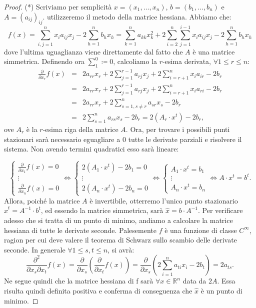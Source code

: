 \begin{proof}(*)
Scriviamo per semplicità $x=(x_1,\ldots,x_n)$, $b=(b_1,\ldots,b_n)$ e $A=(a_{ij})_{ij}$. utilizzeremo il metodo della matrice hessiana. Abbiamo che:
$$f(x)=\sum_{i,j=1}^n x_i a_{ij}x_j  -   2\sum_{h=1}^n b_h x_h= \sum_{k=1}^n a_{kk}x_k^2  +  2\sum_{i=2}^n\sum_{j=1}^{i-1} x_i a_{ij} x_j   -2\sum_{h=1}^n b_h x_h $$ dove l'ultima uguaglianza viene direttamente dal fatto che $A$ è una matrice simmetrica. Definendo ora $\sum_{1}^0 \coloneqq 0$,  calcoliamo la $r$-esima derivata, $\forall 1\leq r\leq n$:
\begin{eqnarray*}
\frac{\partial}{\partial x_r}f(x) &=& 2a_{rr}x_r +2\sum_{j=1}^{r-1}  a_{rj}x_j +2\sum_{i=r+1}^n x_i a_{ir}  -2b_r  \\
&=& 2a_{rr}x_r +2\sum_{j=1}^{r-1}  a_{rj}x_j +2\sum_{i=r+1}^n x_i a_{ri}   -2b_r \\
&=& 2a_{rr}x_r +2\sum_{s=1, s\neq r}^n a_{sr}x_s  -2b_r \\
&=& 2\sum_{s=1}^n a_{rs}x_s  -2b_r = 2(A_r \cdot x^t) -2b_r,
\end{eqnarray*}
ove $A_r$ è la $r$-esima riga della matrice $A$. Ora, per trovare i possibili punti stazionari sarà necessario eguagliare a 0 tutte le derivate parziali e risolvere il sistema. Non avendo termini quadratici esso sarà lineare:

$$
\left\{
\begin{array}{lr}
\frac{\partial}{\partial x_1}f(x)  =  0 \\
\vdots   \\
\frac{\partial}{\partial x_n}f(x)  =  0 
\end{array}
\right.
\Leftrightarrow
\left\{
\begin{array}{lr} 
2(A_1 \cdot x^t) -2b_1 =0 \\
\vdots \\
2(A_n \cdot x^t) -2b_n =0
\end{array}
\right.
\Leftrightarrow
\left\{
\begin{array}{lr} 
A_1 \cdot x^t= b_1  \\
\vdots \\
A_n \cdot x^t = b_n
\end{array}
\right.
\Leftrightarrow
A\cdot x^t = b^t.
$$
Allora, poiché la matrice $A$ è invertibile, otterremo l'unico punto stazionario $\hat{x}^t=A^{-1}\cdot b^t$, ed essendo la matrice simmetrica, sarà $\hat{x}=b\cdot A^{-1}$. Per verificare adesso che si tratta di un punto di minimo, andiamo a calcolare la matrice hessiana di tutte le derivate seconde. Palesemente $f$ è una funzione di classe $C^{\infty}$, ragion per cui deve valere il teorema di Schwarz sullo scambio delle derivate seconde. In generale $\forall 1\leq s,t \leq n$, si avrà:
$$\frac{\partial^2}{\partial x_s\partial x_t} f(x)=\frac{\partial}{\partial x_s}\left(\frac{\partial}{\partial x_t} f(x)\right)=\frac{\partial}{\partial x_s}\left(2\sum_{i=1}^n a_{ti}x_i  -2b_t\right)=2a_{ts}.$$
Ne segue quindi che la matrice hessiana di f sarà $\forall x\in \mathbb{R}^n$ data da $2A$. Essa risulta quindi definita positiva e conferma di conseguenza che $\hat{x}$ è un punto di minimo.
\end{proof}

